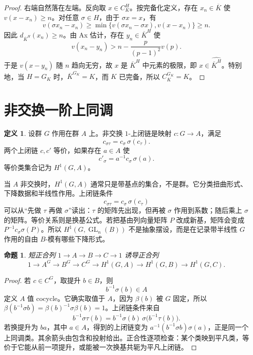 \documentclass[11pt,a4paper,openany]{ctexbook}
\numberwithin{equation}{chapter}
\newcommand{\GL}{\operatorname{GL}}
\theoremstyle{plain}
\newtheorem{proposition}[theorem]{命题}
\theoremstyle{definition}
\newtheorem{definition}[theorem]{定义}
\theoremstyle{remark}
\begin{document}
\begin{proof}
右端自然落在左端。反向取 $x\in C_K^H$。按完备化定义，存在 $x_n\in\overline K$ 使 $v(x-x_n)\ge n$。对任意 $\sigma\in H$，由于 $\sigma x=x$，有
\[
  v(\sigma x_n-x_n)\ge
  \min\{v(\sigma x_n-\sigma x),v(x-x_n)\}\ge n.
\]
因此 $d_{\overline K^H}(x_n)\ge n$。由 Ax 估计，存在 $y_n\in\overline K^H$ 使
\[
  v(x_n-y_n)>n-\frac{p}{(p-1)^2}v(p).
\]
于是 $v(x-y_n)$ 随 $n$ 趋向无穷，故 $x$ 是 $\overline K^H$ 中元素的极限，即 $x\in\widehat{\overline K^H}$。特别地，当 $H=G_K$ 时，$\overline K^{G_K}=K$，而 $K$ 已完备，所以 $C_K^{G_K}=K$。
\end{proof}

\section{非交换一阶上同调}

\begin{definition}
设群 $G$ 作用在群 $A$ 上。非交换 $1$-上闭链是映射 $c:G\to A$，满足
\[
  c_{\sigma\tau}=c_\sigma\,\sigma(c_\tau).
\]
两个上闭链 $c,c'$ 等价，如果存在 $a\in A$ 使
\[
  c'_\sigma=a^{-1}c_\sigma\,\sigma(a).
\]
等价类集合记为 $H^1(G,A)$。
\end{definition}

当 $A$ 非交换时，$H^1(G,A)$ 通常只是带基点的集合，不是群。它分类扭曲形式、下降数据和半线性作用。上闭链条件
\[
  c_{\sigma\tau}=c_\sigma\,\sigma(c_\tau)
\]
可以从“先做 $\tau$ 再做 $\sigma$”读出：$\tau$ 的矩阵先出现，但再被 $\sigma$ 作用到系数；随后乘上 $\sigma$ 的矩阵。等价关系则是换基公式。若把基由列向量矩阵 $P$ 改成新基，矩阵会变成 $P^{-1}c_\sigma\sigma(P)$。所以 $H^1(G,\GL_n(B))$ 不是抽象摆设，而是在记录带半线性 $G$ 作用的自由 $B$-模有哪些下降形式。

\begin{proposition}
短正合列 $1\to A\to B\to C\to1$ 诱导正合列
\[
  1\to A^G\to B^G\to C^G\to H^1(G,A)\to H^1(G,B)\to H^1(G,C).
\]
\end{proposition}

\begin{proof}
若 $c\in C^G$，取提升 $b\in B$，则
\[
  b^{-1}\sigma(b)\in A
\]
定义 $A$ 值 cocycle。它确实取值于 $A$，因为 $\beta(b)$ 被 $G$ 固定，所以 $\beta(b^{-1}\sigma b)=\beta(b)^{-1}\sigma\beta(b)=1$。上闭链条件来自
\[
  b^{-1}\sigma\tau(b)=b^{-1}\sigma(b)\,\sigma\bigl(b^{-1}\tau(b)\bigr).
\]
若换提升为 $ba$，其中 $a\in A$，得到的上闭链变为 $a^{-1}(b^{-1}\sigma b)\sigma(a)$，正是同一个上同调类。其余箭头由包含和投射给出。正合性逐项检查：某个类映到平凡类，等价于它能从前一项提升，或能被一次换基共轭为平凡上闭链。
\end{proof}
\end{document}
